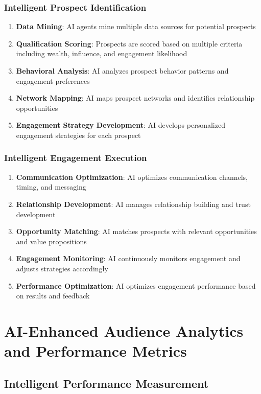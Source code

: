 \subsubsection{Intelligent Prospect Identification}

\begin{enumerate}
    \item \textbf{Data Mining}: AI agents mine multiple data sources for potential prospects
    \item \textbf{Qualification Scoring}: Prospects are scored based on multiple criteria including wealth, influence, and engagement likelihood
    \item \textbf{Behavioral Analysis}: AI analyzes prospect behavior patterns and engagement preferences
    \item \textbf{Network Mapping}: AI maps prospect networks and identifies relationship opportunities
    \item \textbf{Engagement Strategy Development}: AI develops personalized engagement strategies for each prospect
\end{enumerate}

\subsubsection{Intelligent Engagement Execution}

\begin{enumerate}
    \item \textbf{Communication Optimization}: AI optimizes communication channels, timing, and messaging
    \item \textbf{Relationship Development}: AI manages relationship building and trust development
    \item \textbf{Opportunity Matching}: AI matches prospects with relevant opportunities and value propositions
    \item \textbf{Engagement Monitoring}: AI continuously monitors engagement and adjusts strategies accordingly
    \item \textbf{Performance Optimization}: AI optimizes engagement performance based on results and feedback
\end{enumerate}

\section{AI-Enhanced Audience Analytics and Performance Metrics}

\subsection{Intelligent Performance Measurement}

